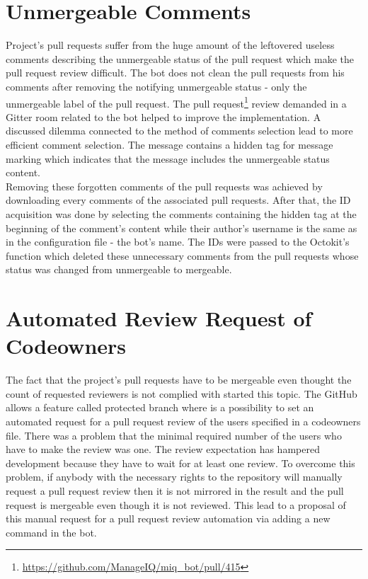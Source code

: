 \section{Unmergeable Comments}

Project's pull requests suffer from the huge amount of the leftovered useless comments describing the unmergeable status of the pull request which make the pull request review difficult. The bot does not clean the pull requests from his comments after removing the notifying unmergeable status - only the unmergeable label of the pull request. The pull request\footnote{\url{https://github.com/ManageIQ/miq_bot/pull/415}} review demanded in a Gitter room related to the bot helped to improve the implementation. A discussed dilemma connected to the method of comments selection lead to more efficient comment selection. The message contains a hidden tag for message marking which indicates that the message includes the unmergeable status content.\\

Removing these forgotten comments of the pull requests was achieved by downloading every comments of the associated pull requests. After that, the ID acquisition was done by selecting the comments containing the hidden tag at the beginning of the comment's content while their author's username is the same as in the configuration file - the bot's name. The IDs were passed to the Octokit's function which deleted these unnecessary comments from the pull requests whose status was changed from unmergeable to mergeable.

\section{Automated Review Request of Codeowners}

The fact that the project's pull requests have to be mergeable even thought the count of requested reviewers is not complied with started this topic. The GitHub allows a feature called protected branch where is a possibility to set an automated request for a pull request review of the users specified in a codeowners file. There was a problem that the minimal required number of the users who have to make the review was one. The review expectation has hampered development because they have to wait for at least one review. To overcome this problem, if anybody with the necessary rights to the repository will manually request a pull request review then it is not mirrored in the result and the pull request is mergeable even though it is not reviewed. This lead to a proposal of this manual request for a pull request review automation via adding a new command in the bot.

